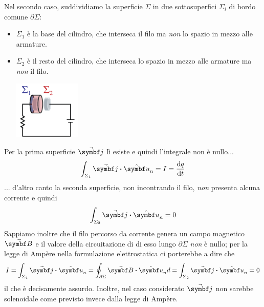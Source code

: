 Nel secondo caso, suddividiamo la superficie $\Sigma$ in due sottosuperfici $\Sigma_i$ di bordo comune $\partial \Sigma$:
\begin{itemize}
	\item $\Sigma_1$ è la base del cilindro, che interseca il filo ma \textit{non} lo spazio in mezzo alle armature.
	\item $\Sigma_2$ è il resto del cilindro, che interseca lo spazio in mezzo alle armature ma \textit{non} il filo.
	\begin{center}
		\includegraphics[width=0.25\textwidth]{images/chp10/chp10correntedispostamento3.pdf}
	\end{center}
\end{itemize}
Per la prima superficie $\vba{j}$ lì esiste e quindi l'integrale non è nullo...
\begin{equation*}
	\int_{\Sigma_1}\vba{j}\vdot\vbh{u}_n=I=\dv{q}{t}
\end{equation*}
... d'altro canto la seconda superficie, non incontrando il filo, \textit{non} presenta alcuna corrente e quindi
\begin{equation*}
	\int_{\Sigma_2}\vba{j}\vdot\vbh{u}_n=0
\end{equation*}
Sappiamo inoltre che il filo percorso da corrente genera un campo magnetico $\vba{B}$ e il valore della circuitazione di di esso lungo $\partial \Sigma$ \textit{non} è nullo; per la legge di Ampère nella formulazione elettrostatica ci porterebbe a dire che
\begin{equation*}
	I=\int_{\Sigma_1}\vba{j}\vdot\vbh{u}_n=\oint_{\partial \Sigma}\vba{B}\vdot\vbh{u}_nd=\int_{\Sigma_2}\vba{j}\vdot\vbh{u}_n=0
\end{equation*} 
il che è decisamente assurdo. Inoltre, nel caso considerato $\vba{j}$ non sarebbe solenoidale come previsto invece dalla legge di Ampère.

